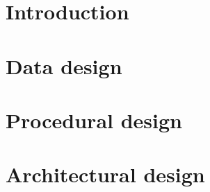 
\section{Introduction}

\section{Data design}

\section{Procedural design}

\section{Architectural design}


